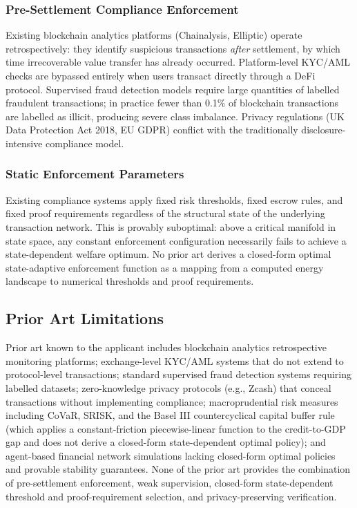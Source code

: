 \documentclass[12pt,a4paper]{article}
\begin{document}
\subsubsection{Pre-Settlement Compliance Enforcement}

Existing blockchain analytics platforms (Chainalysis, Elliptic) operate
retrospectively: they identify suspicious transactions \emph{after}
settlement, by which time irrecoverable value transfer has already occurred.
Platform-level KYC/AML checks are bypassed entirely when users transact
directly through a DeFi protocol. Supervised fraud detection models require
large quantities of labelled fraudulent transactions; in practice fewer than
0.1\% of blockchain transactions are labelled as illicit, producing severe
class imbalance. Privacy regulations (UK Data Protection Act 2018, EU GDPR)
conflict with the traditionally disclosure-intensive compliance model.

\subsubsection{Static Enforcement Parameters}

Existing compliance systems apply fixed risk thresholds, fixed escrow rules,
and fixed proof requirements regardless of the structural state of the
underlying transaction network. This is provably suboptimal: above a critical
manifold in state space, any constant enforcement configuration necessarily
fails to achieve a state-dependent welfare optimum. No prior art derives a
closed-form optimal state-adaptive enforcement function as a mapping from a
computed energy landscape to numerical thresholds and proof requirements.

\subsection{Prior Art Limitations}

Prior art known to the applicant includes blockchain analytics retrospective
monitoring platforms; exchange-level KYC/AML systems that do not extend to
protocol-level transactions; standard supervised fraud detection systems
requiring labelled datasets; zero-knowledge privacy protocols (e.g., Zcash)
that conceal transactions without implementing compliance; macroprudential
risk measures including CoVaR, SRISK, and the Basel III countercyclical
capital buffer rule (which applies a constant-friction piecewise-linear
function to the credit-to-GDP gap and does not derive a closed-form
state-dependent optimal policy); and agent-based financial network
simulations lacking closed-form optimal policies and provable stability
guarantees. None of the prior art provides the combination of pre-settlement
enforcement, weak supervision, closed-form state-dependent threshold and
proof-requirement selection, and privacy-preserving verification.
\end{document}
